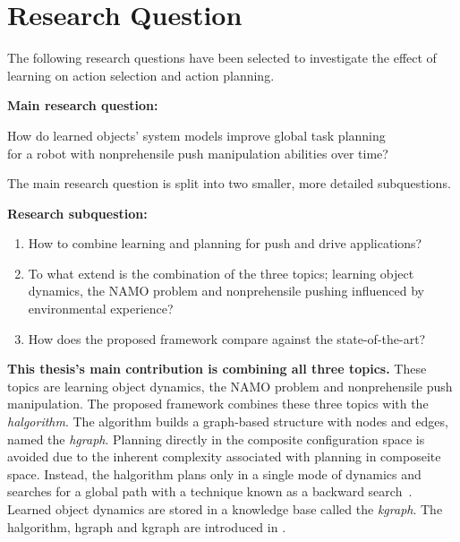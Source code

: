 \section{Research Question}%
\label{sec:research_question}
The following research questions have been selected to investigate the effect of learning on action selection and action planning.\bs

\textbf{Main research question:}
\begin{center}%
\label{researchquestion:main}
\large
How do learned objects' system models improve global task planning\\for a robot with nonprehensile push manipulation abilities over time?
\end{center}

The main research question is split into two smaller, more detailed subquestions.\bs

\textbf{Research subquestion:}
\begin{enumerate}
    \item\label{researchsubquestion:does_it_work} How to combine learning and planning for push and drive applications?
    \item\label{researchsubquestion:does_it_remember} To what extend is the combination of the three topics; learning object dynamics, the \ac{NAMO} problem and nonprehensile pushing influenced by environmental experience?
    \item\label{researchsubquestion:does_it_compare} How does the proposed framework compare against the state-of-the-art?
\end{enumerate}

\textbf{This thesis's main contribution is combining all three topics.} These topics are learning object dynamics, the \ac{NAMO} problem and nonprehensile push manipulation. The proposed framework combines these three topics with the \textit{\acl{halgorithm}}. The algorithm builds a graph-based structure with nodes and edges, named the \textit{\acl{hgraph}}. Planning directly in the composite configuration space is avoided due to the inherent complexity associated with planning in composeite space. Instead, the \acl{halgorithm} plans only in a single mode of dynamics and searches for a global path with a technique known as a backward search~\cite{krontiris_dealing_2015}. Learned object dynamics are stored in a knowledge base called the \textit{\acl{kgraph}}. The \ac{halgorithm}, \ac{hgraph} and \ac{kgraph} are introduced in .\bs


